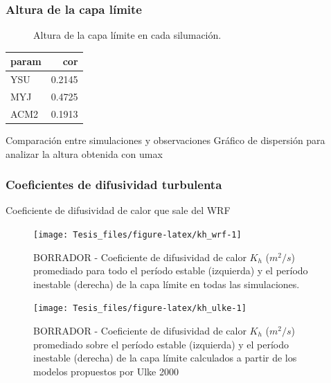 \documentclass[12pt,spanish,oneside]{book}
\begin{document}
\subsubsection{Altura de la capa
límite}\label{altura-de-la-capa-limite-1}

\begin{figure}

{\centering {}\newline{}

}

\caption{Altura de la capa límite en cada silumación. \label{pblh-wrf}}\label{fig:pblh-wrf}
\end{figure}

\begin{longtable}[]{@{}lr@{}}
\toprule
param & cor\tabularnewline
\midrule
\endhead
YSU & 0.2145\tabularnewline
MYJ & 0.4725\tabularnewline
ACM2 & 0.1913\tabularnewline
\bottomrule
\end{longtable}

Comparación entre simulaciones y observaciones Gráfico de dispersión
para analizar la altura obtenida con umax

\subsubsection{Coeficientes de difusividad
turbulenta}\label{coeficientes-de-difusividad-turbulenta-1}

Coeficiente de difusividad de calor que sale del WRF

\begin{figure}

{\centering \texttt{[image: Tesis\_files/figure-latex/kh\_wrf-1]} 

}

\caption{BORRADOR - Coeficiente de difusividad de calor $K_h$ ($m^2/s$) promediado para todo el período estable (izquierda) y el período inestable (derecha) de la capa límite en todas las simulaciones. \label{kh_wrf}}\label{fig:kh_wrf}
\end{figure}

\begin{figure}

{\centering \texttt{[image: Tesis\_files/figure-latex/kh\_ulke-1]} 

}

\caption{BORRADOR - Coeficiente de difusividad de calor $K_h$ ($m^2/s$) promediado sobre el período estable (izquierda) y el período inestable (derecha) de la capa límite calculados a partir de los modelos propuestos por Ulke 2000 \label{kh-ulke}}\label{fig:kh_ulke}
\end{figure}
\end{document}
